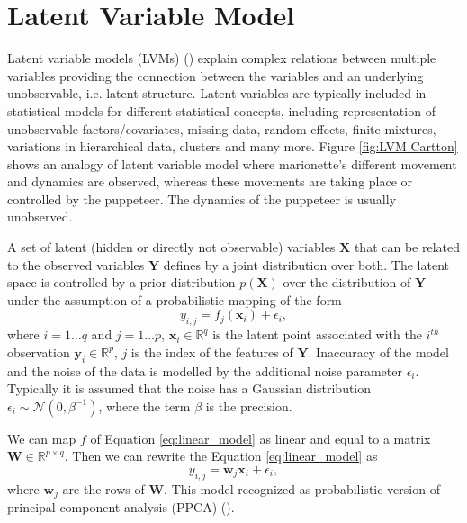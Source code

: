 \section{Latent Variable Model}\label{sec:LVM}
Latent variable models (LVMs) (\cite{Bishop:1999}) explain complex relations between multiple variables providing the connection between the variables and an underlying unobservable, i.e. latent structure. Latent variables are typically included in statistical models for different statistical concepts, including representation of unobservable factors/covariates, missing data, random effects, finite mixtures, variations in hierarchical data, clusters and many more. Figure \ref{fig:LVM Cartton} shows an analogy of latent variable model where marionette's different movement and dynamics are observed, whereas these movements are taking place or controlled by the puppeteer. The dynamics of the puppeteer is usually unobserved.

A set of latent (hidden or directly not observable) variables $\textbf{X}$ that can be related to the observed variables $\textbf{Y}$ defines by a joint distribution over both. The latent space is 
controlled by a prior distribution $p\left(\textbf{X}\right)$ over the distribution of $\textbf{Y}$ under the assumption of a probabilistic mapping of the form
\begin{equation} \label{eq:linear_model}
y_{i,j} = f_j\left(\textbf{x}_{i}\right) + \epsilon_{i},
\end{equation}
where $i=1 \dots q$ and $j=1 \dots p$, $\textbf{x}_i \in \mathbb{R}^q$ is the latent point associated with the $i^{th}$ observation $\textbf{y}_i \in \mathbb{R}^p$, $j$ is the index of the features of $\textbf{Y}$. Inaccuracy of the model  and the noise of the data is modelled by the additional noise parameter $\epsilon_{i}$. Typically it is assumed that the noise has a Gaussian distribution $\epsilon_i \sim \mathcal{N} \left(0,\beta^{-1}\right)$, where the term $\beta$ is the precision.

We can map $f$ of Equation \ref{eq:linear_model} as linear and equal to a matrix $\textbf{W}\in\mathbb{R}^{p\times q}$. Then we can rewrite the Equation \ref{eq:linear_model} as
\begin{equation} \label{eq:linear_model_matrix}
y_{i,j} = \textbf{w}_j\textbf{x}_{i} + \epsilon_{i},
\end{equation}
where $\textbf{w}_j$ are the rows of $\textbf{W}$. This model recognized as probabilistic version of principal component analysis (PPCA) (\cite{Roweis:1998, Tipping:1999}). 


